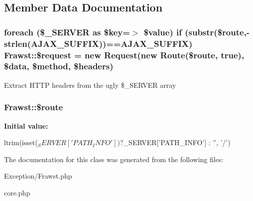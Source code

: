 \subsection{Member Data Documentation}
\hypertarget{classFrawst_a0db08eb8a67a4f462d0602b663dddc90}{
\subsubsection[{\$request}]{\setlength{\rightskip}{0pt plus 5cm}foreach (\$\_\-SERVER as \$key=$>$ \$value) if (substr(\$route,-\/strlen(AJAX\_\-SUFFIX))==AJAX\_\-SUFFIX) Frawst::\$request = new {\bf Request}(new {\bf Route}(\$route, true), \$data, \$method, \$headers)}}
\label{classFrawst_a0db08eb8a67a4f462d0602b663dddc90}
Extract HTTP headers from the ugly \$\_\-SERVER array \hypertarget{classFrawst_a83dcf7e16e11a55f3f79d6f4722d12a4}{
\subsubsection[{\$route}]{\setlength{\rightskip}{0pt plus 5cm}Frawst::\$route}}
\label{classFrawst_a83dcf7e16e11a55f3f79d6f4722d12a4}
{\bfseries Initial value:}
\begin{DoxyCode}
 ltrim(isset($_SERVER['PATH_INFO'])
                        ? $_SERVER['PATH_INFO']
                        : '', '/')
\end{DoxyCode}


The documentation for this class was generated from the following files:\begin{DoxyCompactItemize}
\item 
Exception/Frawst.php\item 
core.php\end{DoxyCompactItemize}
